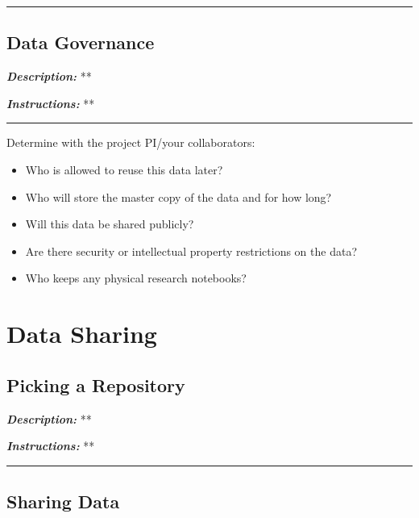 \documentclass[
]{book}
\providecommand{\tightlist}{%
  \setlength{\itemsep}{0pt}\setlength{\parskip}{0pt}}
\begin{document}
\begin{center}\rule{0.5\linewidth}{0.5pt}\end{center}

\hypertarget{data-governance}{%
\section{Data Governance}\label{data-governance}}

\textbf{\emph{Description:}} **

\textbf{\emph{Instructions:}} **

\begin{center}\rule{0.5\linewidth}{0.5pt}\end{center}

Determine with the project PI/your collaborators:

\begin{itemize}
\tightlist
\item
  Who is allowed to reuse this data later?
\item
  Who will store the master copy of the data and for how long?
\item
  Will this data be shared publicly?
\item
  Are there security or intellectual property restrictions on the data?
\item
  Who keeps any physical research notebooks?
\end{itemize}

\hypertarget{data-sharing}{%
\chapter{Data Sharing}\label{data-sharing}}

\hypertarget{data-repository}{%
\section{Picking a Repository}\label{data-repository}}

\textbf{\emph{Description:}} **

\textbf{\emph{Instructions:}} **

\begin{center}\rule{0.5\linewidth}{0.5pt}\end{center}

\hypertarget{share-data}{%
\section{Sharing Data}\label{share-data}}
\end{document}
